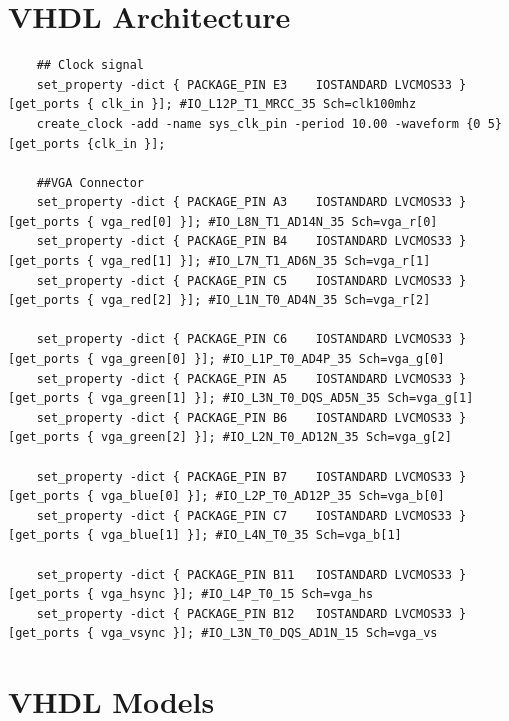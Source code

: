  \section{VHDL Architecture}
    \begin{verbatim}
    ## Clock signal
    set_property -dict { PACKAGE_PIN E3    IOSTANDARD LVCMOS33 } [get_ports { clk_in }]; #IO_L12P_T1_MRCC_35 Sch=clk100mhz
    create_clock -add -name sys_clk_pin -period 10.00 -waveform {0 5} [get_ports {clk_in }];
            
    ##VGA Connector            
    set_property -dict { PACKAGE_PIN A3    IOSTANDARD LVCMOS33 } [get_ports { vga_red[0] }]; #IO_L8N_T1_AD14N_35 Sch=vga_r[0]
    set_property -dict { PACKAGE_PIN B4    IOSTANDARD LVCMOS33 } [get_ports { vga_red[1] }]; #IO_L7N_T1_AD6N_35 Sch=vga_r[1]
    set_property -dict { PACKAGE_PIN C5    IOSTANDARD LVCMOS33 } [get_ports { vga_red[2] }]; #IO_L1N_T0_AD4N_35 Sch=vga_r[2]
            
    set_property -dict { PACKAGE_PIN C6    IOSTANDARD LVCMOS33 } [get_ports { vga_green[0] }]; #IO_L1P_T0_AD4P_35 Sch=vga_g[0]
    set_property -dict { PACKAGE_PIN A5    IOSTANDARD LVCMOS33 } [get_ports { vga_green[1] }]; #IO_L3N_T0_DQS_AD5N_35 Sch=vga_g[1]
    set_property -dict { PACKAGE_PIN B6    IOSTANDARD LVCMOS33 } [get_ports { vga_green[2] }]; #IO_L2N_T0_AD12N_35 Sch=vga_g[2]
    
    set_property -dict { PACKAGE_PIN B7    IOSTANDARD LVCMOS33 } [get_ports { vga_blue[0] }]; #IO_L2P_T0_AD12P_35 Sch=vga_b[0]
    set_property -dict { PACKAGE_PIN C7    IOSTANDARD LVCMOS33 } [get_ports { vga_blue[1] }]; #IO_L4N_T0_35 Sch=vga_b[1]
            
    set_property -dict { PACKAGE_PIN B11   IOSTANDARD LVCMOS33 } [get_ports { vga_hsync }]; #IO_L4P_T0_15 Sch=vga_hs
    set_property -dict { PACKAGE_PIN B12   IOSTANDARD LVCMOS33 } [get_ports { vga_vsync }]; #IO_L3N_T0_DQS_AD1N_15 Sch=vga_vs
    \end{verbatim}
 \section{VHDL Models}
 
